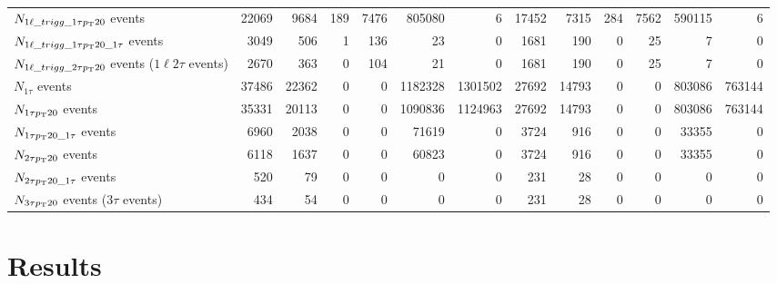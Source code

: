 \documentclass[letterpaper,12pt]{article}
\begin{document}
\begin{table}[h]
{\begin{tabular}{l|rr|rrrr|rr|rrrr}
      $N_{1\ell\_trigg\_1\tau p_{\mathrm{T}}20}$ events & 22069 & 9684 & 189 & 7476 & 805080 & 6 & 17452 & 7315 & 284 & 7562 & 590115 & 6\\
      $N_{1\ell\_trigg\_1\tau p_{\mathrm{T}}20\_1\tau}$ events & 3049 & 506 & 1 & 136 & 23 & 0 & 1681 & 190 & 0 & 25 & 7 & 0\\
      $N_{1\ell\_trigg\_2\tau p_{\mathrm{T}}20}$ events ($1\ell2\tau$ events) & 2670 & 363 & 0 & 104 & 21 & 0 & 1681 & 190 & 0 & 25 & 7 & 0\\
      $N_{1\tau}$ events & 37486 & 22362 & 0 & 0 & 1182328 & 1301502 & 27692 & 14793 & 0 & 0 & 803086 & 763144\\
      $N_{1\tau p_{\mathrm{T}}20}$ events & 35331 & 20113 & 0 & 0 & 1090836 & 1124963 & 27692 & 14793 & 0 & 0 & 803086 & 763144\\
      $N_{1\tau p_{\mathrm{T}}20\_1\tau}$ events & 6960 & 2038 & 0 & 0 & 71619 & 0 & 3724 & 916 & 0 & 0 & 33355 & 0\\
      $N_{2\tau p_{\mathrm{T}}20}$ events & 6118 & 1637 & 0 & 0 & 60823 & 0 & 3724 & 916 & 0 & 0 & 33355 & 0\\
      $N_{2\tau p_{\mathrm{T}}20\_1\tau}$ events & 520 & 79 & 0 & 0 & 0 & 0 & 231 & 28 & 0 & 0 & 0 & 0\\
      $N_{3\tau p_{\mathrm{T}}20}$ events ($3\tau$ events) & 434 & 54 & 0 & 0 & 0 & 0 & 231 & 28 & 0 & 0 & 0 & 0\\
      \hline
      \hline	
    \end{tabular}%
  }
  \caption{}
  \label{tab:cutflow}
\end{table}

\section{Results}
\label{sec:results}
\end{document}
